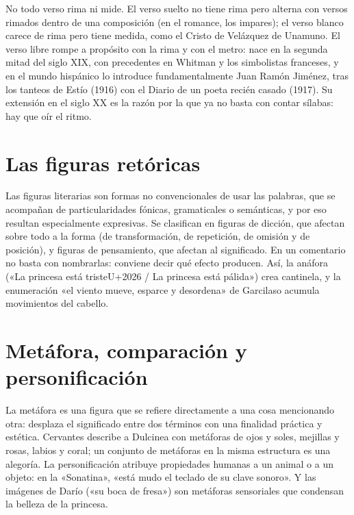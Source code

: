 \documentclass{book}
\begin{document}
No todo verso rima ni mide. El verso suelto no tiene rima pero alterna con versos rimados dentro de una composición (en el romance, los impares); el verso blanco carece de rima pero tiene medida, como el Cristo de Velázquez de Unamuno. El verso libre rompe a propósito con la rima y con el metro: nace en la segunda mitad del siglo XIX, con precedentes en Whitman y los simbolistas franceses, y en el mundo hispánico lo introduce fundamentalmente Juan Ramón Jiménez, tras los tanteos de Estío (1916) con el Diario de un poeta recién casado (1917). Su extensión en el siglo XX es la razón por la que ya no basta con contar sílabas: hay que oír el ritmo.


\section{Las figuras retóricas}

Las figuras literarias son formas no convencionales de usar las palabras, que se acompañan de particularidades fónicas, gramaticales o semánticas, y por eso resultan especialmente expresivas. Se clasifican en figuras de dicción, que afectan sobre todo a la forma (de transformación, de repetición, de omisión y de posición), y figuras de pensamiento, que afectan al significado. En un comentario no basta con nombrarlas: conviene decir qué efecto producen. Así, la anáfora («La princesa está triste{U+2026} / La princesa está pálida») crea cantinela, y la enumeración «el viento mueve, esparce y desordena» de Garcilaso acumula movimientos del cabello.


\section{Metáfora, comparación y personificación}

La metáfora es una figura que se refiere directamente a una cosa mencionando otra: desplaza el significado entre dos términos con una finalidad práctica y estética. Cervantes describe a Dulcinea con metáforas de ojos y soles, mejillas y rosas, labios y coral; un conjunto de metáforas en la misma estructura es una alegoría. La personificación atribuye propiedades humanas a un animal o a un objeto: en la «Sonatina», «está mudo el teclado de su clave sonoro». Y las imágenes de Darío («su boca de fresa») son metáforas sensoriales que condensan la belleza de la princesa.
\end{document}

